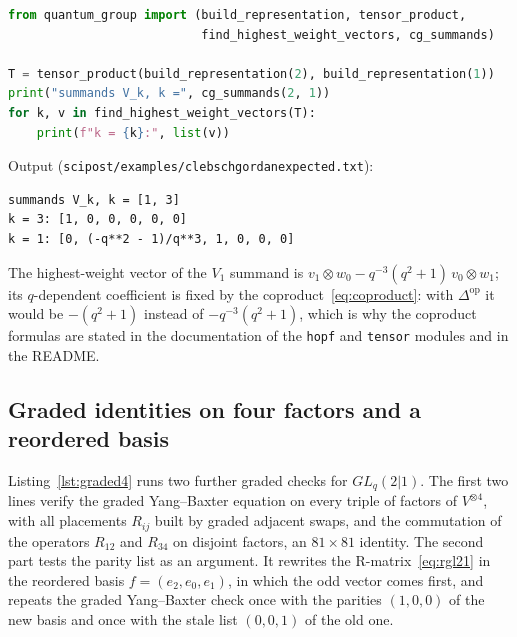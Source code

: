 \documentclass{SciPost}
\newcommand{\code}[1]{\texttt{\begingroup\def\_{\textunderscore\allowbreak}#1\endgroup}}
\newcommand{\GL}{GL_q(2|1)}
\begin{document}
\noindent\begin{minipage}{\linewidth}
\begin{lstlisting}[language=Python, caption={Highest-weight vectors of $V_2\otimes V_1$: \code{scipost/examples/clebsch\_gordan.py}.}, label={lst:cg}]
from quantum_group import (build_representation, tensor_product,
                           find_highest_weight_vectors, cg_summands)

T = tensor_product(build_representation(2), build_representation(1))
print("summands V_k, k =", cg_summands(2, 1))
for k, v in find_highest_weight_vectors(T):
    print(f"k = {k}:", list(v))
\end{lstlisting}
\end{minipage}
Output (\code{scipost/examples/clebsch\_gordan\_expected.txt}):
\begin{lstlisting}[style=output]
summands V_k, k = [1, 3]
k = 3: [1, 0, 0, 0, 0, 0]
k = 1: [0, (-q**2 - 1)/q**3, 1, 0, 0, 0]
\end{lstlisting}
The highest-weight vector of the $V_1$ summand is $v_1\otimes w_0-q^{-3}(q^2+1)\,v_0\otimes w_1$; its $q$-dependent coefficient is fixed by the coproduct~\eqref{eq:coproduct}: with $\Delta^{\mathrm{op}}$ it would be $-(q^2+1)$ instead of $-q^{-3}(q^2+1)$, which is why the coproduct formulas are stated in the documentation of the \code{hopf} and \code{tensor} modules and in the README.


\subsection{Graded identities on four factors and a reordered basis}
\label{sec:ex-graded}

Listing~\ref{lst:graded4} runs two further graded checks for $\GL$. The first two lines verify the graded Yang--Baxter equation on every triple of factors of $V^{\otimes4}$, with all placements $R_{ij}$ built by graded adjacent swaps, and the commutation of the operators $R_{12}$ and $R_{34}$ on disjoint factors, an $81\times81$ identity. The second part tests the parity list as an argument. It rewrites the R-matrix~\eqref{eq:rgl21} in the reordered basis $f=(e_2,e_0,e_1)$, in which the odd vector comes first, and repeats the graded Yang--Baxter check once with the parities $(1,0,0)$ of the new basis and once with the stale list $(0,0,1)$ of the old one.
\end{document}
